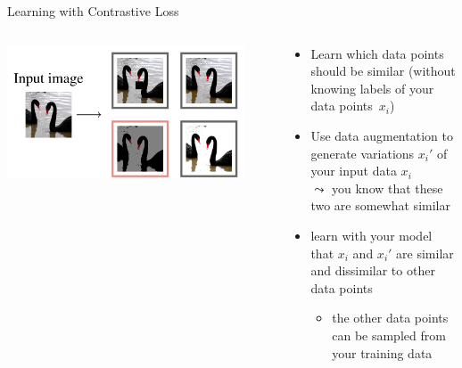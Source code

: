\documentclass[aspectratio=169]{../latex_main/tntbeamer}  %
\begin{document}
    \begin{frame}[c]{Learning with Contrastive Loss}

        \begin{columns}
    
        \begin{column}{0.5\textwidth}
    
            \includegraphics[width=0.9\textwidth]{figure/augmentation.png}
            
        \end{column}
    
        \begin{column}{0.55\textwidth}
    
            \begin{itemize}
                \item Learn which data points should be similar (without knowing labels of your data points~$x_i$)
                \item Use data augmentation to generate variations $x_i'$ of your input data $x_i$\\ $\leadsto$ you know that these two are somewhat similar
                \item learn with your model that $x_i$ and $x_i'$ are similar and dissimilar to other data points
                \begin{itemize}
                    \item the other data points can be sampled from your training data
                \end{itemize}
            \end{itemize}
            
        \end{column}
    
        \end{columns}
        
        
    \end{frame}
\end{document}
